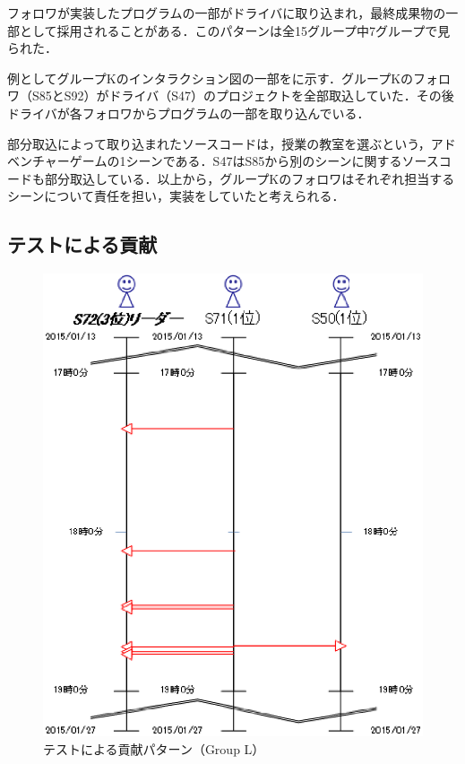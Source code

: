 フォロワが実装したプログラムの一部がドライバに取り込まれ，最終成果物の一部として採用されることがある．このパターンは全15グループ中7グループで見られた．

例としてグループKのインタラクション図の一部をに示す．グループKのフォロワ（S85とS92）がドライバ（S47）のプロジェクトを全部取込していた．その後ドライバが各フォロワからプログラムの一部を取り込んでいる．

部分取込によって取り込まれたソースコードは，授業の教室を選ぶという，アドベンチャーゲームの1シーンである．S47はS85から別のシーンに関するソースコードも部分取込している．以上から，グループKのフォロワはそれぞれ担当するシーンについて責任を担い，実装をしていたと考えられる．


\subsection{テストによる貢献}

\begin{figure}[h]
	\begin{center}
		\includegraphics[scale=0.75]{img/flowL.eps}
		\caption{テストによる貢献パターン（Group L）}
		\label{fig:flowL}
	\end{center}
\end{figure}

